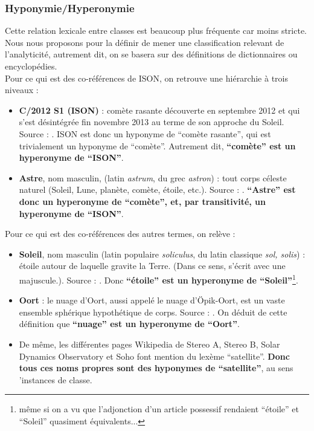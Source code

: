 \documentclass[a4paper,10pt]{article}
\begin{document}
		\subsubsection{Hyponymie/Hyperonymie}
			Cette relation lexicale entre classes est beaucoup plus fréquente car moins stricte. Nous nous proposons pour la définir de mener une classification relevant de l'analyticité, autrement dit, on se basera sur des définitions de dictionnaires ou encyclopédies.\\
			Pour ce qui est des co-références de ISON, on retrouve une hiérarchie à trois niveaux :
			\begin{itemize}
				\item \textbf{C/2012 S1 (ISON)} : comète rasante découverte en septembre 2012 et qui s'est désintégrée fin novembre 2013 au terme de son approche du Soleil. Source : \cite{ISON}. ISON est donc un hyponyme de ``comète rasante'', qui est trivialement un hyponyme de ``comète''. Autrement dit, \textbf{``comète'' est un hyperonyme de ``ISON''}.
				\item \textbf{Astre}, nom masculin, (latin \textit{astrum}, du grec \textit{astron}) : tout corps céleste naturel (Soleil, Lune, planète, comète, étoile, etc.). Source : \cite{astre}. \textbf{``Astre'' est donc un hyperonyme de ``comète'', et, par transitivité, un hyperonyme de ``ISON''}.
			\end{itemize}
			Pour ce qui est des co-références des autres termes, on relève :
			\begin{itemize}
				\item \textbf{Soleil}, nom masculin
				(latin populaire \textit{soliculus}, du latin classique \textit{sol, solis}) : étoile autour de laquelle gravite la Terre. (Dans ce sens, s'écrit avec une majuscule.). Source : \cite{soleil}. Donc \textbf{``étoile'' est un hyperonyme de ``Soleil''}\footnote{même si on a vu que l'adjonction d'un article possessif rendaient ``étoile'' et ``Soleil'' quasiment équivalents...}.
				\item \textbf{Oort} : le nuage d'Oort, aussi appelé le nuage d'Öpik-Oort, est un vaste ensemble sphérique hypothétique de corps. Source : \cite{oort}. On déduit de cette définition que \textbf{``nuage'' est un hyperonyme de ``Oort''}.
				\item De même, les différentes pages Wikipedia de Stereo A, Stereo B, Solar Dynamics Observatory et Soho font mention du lexème ``satellite''. \textbf{Donc tous ces noms propres sont des hyponymes de ``satellite''}, au sens 'instances de classe.
			\end{itemize}
\end{document}
